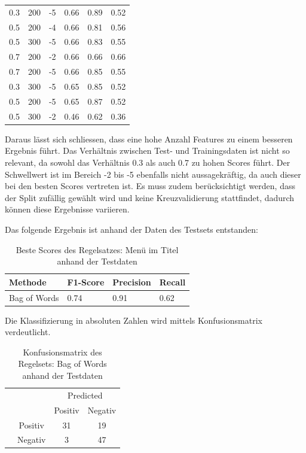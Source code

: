 \begin{table}
\begin{tabular}{ | l | l | l | l | l | l | }
		0.3 & 200 & -5 & 0.66 & 0.89 & 0.52 \\ 
		0.5 & 200 & -4 & 0.66 & 0.81 & 0.56 \\
		0.5 & 300 & -5 & 0.66 & 0.83 & 0.55 \\ 
		0.7 & 200 & -2 & 0.66 & 0.66 & 0.66 \\ 
		0.7 & 200 & -5 & 0.66 & 0.85 & 0.55 \\ 
		0.3 & 300 & -5 & 0.65 & 0.85 & 0.52 \\ 
		0.5 & 200 & -5 & 0.65 & 0.87 & 0.52 \\
		0.5 & 300 & -2 & 0.46 & 0.62 & 0.36 \\ \hline
	\end{tabular}
\end{table}
Daraus lässt sich schliessen, dass eine hohe Anzahl Features zu einem besseren Ergebnis führt.
Das Verhältnis zwischen Test- und Trainingsdaten ist nicht so relevant, da sowohl das Verhältnis 0.3 als auch 0.7 zu hohen Scores führt.
Der Schwellwert ist im Bereich -2 bis -5 ebenfalls nicht aussagekräftig, da auch dieser bei den besten Scores vertreten ist.
Es muss zudem berücksichtigt werden, dass der Split zufällig gewählt wird und keine Kreuzvalidierung stattfindet, dadurch können diese Ergebnisse variieren.
\FloatBarrier

Das folgende Ergebnis ist anhand der Daten des Testsets entstanden:
\begin{table}[H]
	\caption{Beste Scores des Regelsatzes: Menü im Titel anhand der Testdaten}
	\centering
	\begin{tabular}{|l|l|l|l|}
		\hline
		Methode & F1-Score & Precision & Recall\\
		\hline
		Bag of Words & 0.74 & 0.91 & 0.62\\
		\hline
	\end{tabular}
\end{table}
Die Klassifizierung in absoluten Zahlen wird mittels Konfusionsmatrix verdeutlicht.
\begin{table}[H]
	\caption{Konfusionsmatrix des Regelsets: Bag of Words anhand der Testdaten}
	\centering
	\begin{tabular}{@{}cc|cc@{}}
		\multicolumn{1}{c}{} &\multicolumn{1}{c}{} &\multicolumn{2}{c}{Predicted} \\ 
		\multicolumn{1}{c}{} & 
		\multicolumn{1}{c|}{} & 
		\multicolumn{1}{c}{Positiv} & 
		\multicolumn{1}{c}{Negativ} \\ 
		\cline{2-4}
		\multirow[c]{2}{*}{\rotatebox[origin=tr]{90}{Actual}}
		& Positiv  & 31   & 19   \\[1.5ex]
		& Negativ  & 3    & 47 \\ 
		\cline{2-4}
	\end{tabular}
\end{table}
